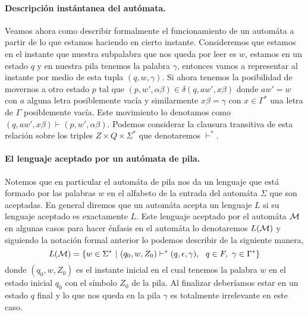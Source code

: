 \documentclass[tesis.tex]{subfiles}
\begin{document}
\paragraph{Descripción instántanea del autómata.} Veamos ahora como describir formalmente el funcionamiento de un automáta a partir de lo que estamos haciendo en cierto instante. 
Consideremos que estamos en el instante que nuestra subpalabra que nos queda por leer es $w$, estamos en un estado $q$ y en nuestra pila tenemos la palabra $\gamma$, entonces vamos a representar al instante por medio de esta tupla $(q,w,\gamma)$.
Si ahora tenemos la posibilidad de movernos a otro estado $p$ tal que $(p,w',\alpha\beta) \in \delta (q,aw',x\beta)$ donde $aw' = w$ con $a$ alguna letra posiblemente vacía y similarmente $x \beta = \gamma$ con $x \in \Gamma^*$ una letra de $\Gamma$ posiblemente vacía. 
Este movimiento lo denotamos como $(q,aw',x\beta) \vdash (p,w',\alpha \beta)$. 
Podemos considerar la clausura transitiva de esta relación sobre los triples $Z \times Q \times \Sigma^*$ que denotaremos $\vdash^*$.


\paragraph{El lenguaje aceptado por un autómata de pila.} 
Notemos que en particular el automáta de pila nos da un lenguaje que está formado por las palabras $w$ en el alfabeto de la entrada del automáta $\Sigma$ que son aceptadas. 
En general diremos que un automáta acepta un lenguaje $L$ si su lenguaje aceptado es exactamente $L$. 
Este lenguaje aceptado por el automáta $\cal M$ en algunas casos para hacer énfasis en el automáta lo denotaremos $L {(\cal M)}$ y siguiendo la notación formal anterior lo podemos describir de la siguiente manera,
\begin{equation*}
	L( {\cal M}) = \{ w \in \Sigma^* \ | \ (q_0,w,Z_0) \vdash^* (q, \epsilon, \gamma), \ \ q \in F, \ \gamma \in \Gamma^*      \}
\end{equation*}
donde $(q_0, w, Z_0)$ es el instante inicial en el cual tenemos la palabra $w$ en el estado inicial $q_0$ con el símbolo $Z_0$ de la pila. Al finalizar deberíamos estar en un estado $q$ final y lo que nos queda en la pila $\gamma$ es totalmente irrelevante en este caso.
\end{document}
